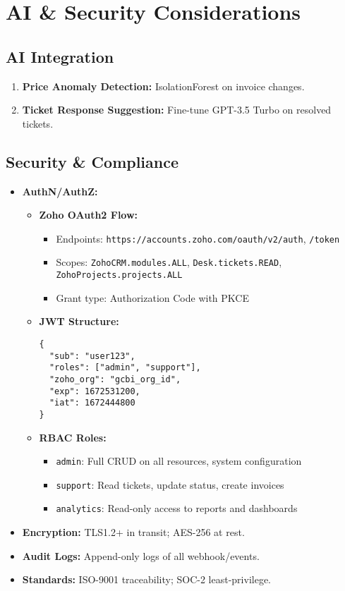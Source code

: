 \section{AI \& Security Considerations}

\subsection{AI Integration}
\begin{enumerate}
  \item \textbf{Price Anomaly Detection:} IsolationForest on invoice changes.
  \item \textbf{Ticket Response Suggestion:} Fine-tune GPT-3.5 Turbo on resolved tickets.
\end{enumerate}

\subsection{Security \& Compliance}
\begin{itemize}
  \item \textbf{AuthN/AuthZ:} 
    \begin{itemize}
      \item \textbf{Zoho OAuth2 Flow:} 
        \begin{itemize}
          \item Endpoints: \texttt{https://accounts.zoho.com/oauth/v2/auth}, \texttt{/token}
          \item Scopes: \texttt{ZohoCRM.modules.ALL}, \texttt{Desk.tickets.READ}, \texttt{ZohoProjects.projects.ALL}
          \item Grant type: Authorization Code with PKCE
        \end{itemize}
      \item \textbf{JWT Structure:} 
        \begin{verbatim}
{
  "sub": "user123",
  "roles": ["admin", "support"],
  "zoho_org": "gcbi_org_id",
  "exp": 1672531200,
  "iat": 1672444800
}
        \end{verbatim}
      \item \textbf{RBAC Roles:}
        \begin{itemize}
          \item \texttt{admin}: Full CRUD on all resources, system configuration
          \item \texttt{support}: Read tickets, update status, create invoices
          \item \texttt{analytics}: Read-only access to reports and dashboards
        \end{itemize}
    \end{itemize}
  \item \textbf{Encryption:} TLS1.2+ in transit; AES-256 at rest.
  \item \textbf{Audit Logs:} Append-only logs of all webhook/events.
  \item \textbf{Standards:} ISO-9001 traceability; SOC-2 least-privilege.
\end{itemize} 